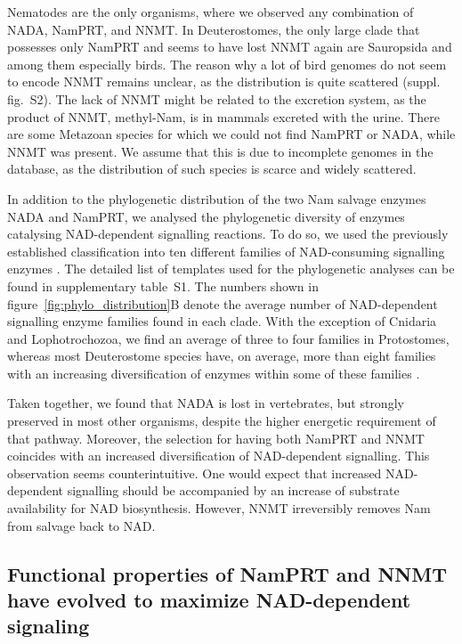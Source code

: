 Nematodes are the only organisms, where we observed any combination of NADA, NamPRT, and NNMT. In Deuterostomes, the only large clade that possesses only NamPRT and seems to have lost NNMT again are Sauropsida and among them especially birds. The reason why a lot of bird genomes do not seem to encode NNMT remains unclear, as the distribution is quite scattered (suppl. fig.~S2). The lack of NNMT might be related to the excretion system, as the product of NNMT, methyl-Nam, is in mammals excreted with the urine. There are some Metazoan species for which we could not find NamPRT or NADA, while NNMT was present. We assume that this is due to incomplete genomes in the database, as the distribution of such species is scarce and widely scattered.

In addition to the phylogenetic distribution of the two Nam salvage enzymes NADA and NamPRT, we analysed the phylogenetic diversity of enzymes catalysing NAD-dependent signalling reactions. To do so, we used the previously established classification into ten different families of NAD-consuming signalling enzymes \cite{Gossmann2012FEBS}. The detailed list of templates used for the phylogenetic analyses can be found in supplementary table~S1. The numbers shown in figure~\ref{fig:phylo_distribution}B denote the average number of NAD-dependent signalling enzyme families found in each clade. With the exception of Cnidaria and Lophotrochozoa, we find an average of three to four families in Protostomes, whereas most Deuterostome species have, on average, more than eight families with an increasing diversification of enzymes within some of these families \cite{Gossmann2014DNAR}.

Taken together, we found that NADA is lost in vertebrates, but strongly preserved in most other organisms, despite the higher energetic requirement of that pathway. Moreover, the selection for having both NamPRT and NNMT coincides with an increased diversification of NAD-dependent signalling. This observation seems counterintuitive. One would expect that increased NAD-dependent signalling should be accompanied by an increase of substrate availability for NAD biosynthesis. However, NNMT irreversibly removes Nam from salvage back to NAD.


\subsection{Functional properties of NamPRT and NNMT have evolved to maximize NAD-dependent signaling}

